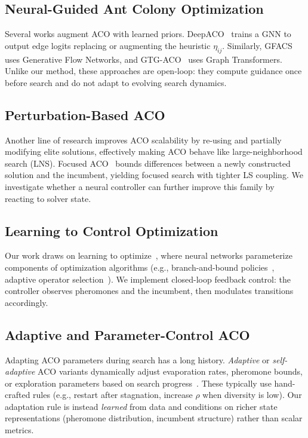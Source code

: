 \documentclass[sigconf,anonymous,review]{acmart}
\theoremstyle{definition}
\theoremstyle{plain}
\begin{document}
\subsection{Neural-Guided Ant Colony Optimization}
Several works augment ACO with learned priors.
DeepACO~\cite{deepaco} trains a GNN to output edge logits replacing or augmenting the heuristic $\eta_{ij}$.
Similarly, GFACS~\cite{gfacs} uses Generative Flow Networks, and GTG-ACO~\cite{gtgaco} uses Graph Transformers.
Unlike our method, these approaches are open-loop: they compute guidance once before search and do not adapt to evolving search dynamics.

\subsection{Perturbation-Based ACO}
Another line of research improves ACO scalability by re-using and partially modifying elite solutions, effectively making ACO behave like large-neighborhood search (LNS).
Focused ACO~\cite{faco} bounds differences between a newly constructed solution and the incumbent, yielding focused search with tighter LS coupling.
We investigate whether a neural controller can further improve this family by reacting to solver state.

\subsection{Learning to Control Optimization}
Our work draws on learning to optimize~\cite{bengio2021machine}, where neural networks parameterize components of optimization algorithms (e.g., branch-and-bound policies~\cite{gasse2019exact}, adaptive operator selection~\cite{li2019learning}).
We implement closed-loop feedback control: the controller observes pheromones and the incumbent, then modulates transitions accordingly.

\subsection{Adaptive and Parameter-Control ACO}
Adapting ACO parameters during search has a long history.
\emph{Adaptive} or \emph{self-adaptive} ACO variants dynamically adjust evaporation rates, pheromone bounds, or exploration parameters based on search progress~\cite{stutzle2000max,pellegrini2012ant}.
These typically use hand-crafted rules (e.g., restart after stagnation, increase $\rho$ when diversity is low).
Our adaptation rule is instead \emph{learned} from data and conditions on richer state representations (pheromone distribution, incumbent structure) rather than scalar metrics.
\end{document}
